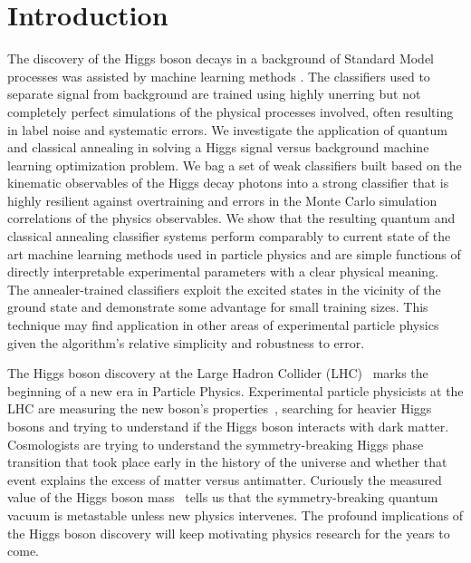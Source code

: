 \documentclass[.chapters/Higgs/.chapters/Higgs/main.tex]{subfiles}
\begin{document}

\section*{Introduction}
	The discovery of the Higgs boson decays in a background of Standard Model processes was assisted by machine learning methods \cite{Chatrchyan:2012xdj,Aad:2012tfa}. The classifiers used to separate signal from background are trained using  highly unerring but not completely perfect simulations of the physical processes involved, often resulting in label noise and systematic errors. We investigate the application of quantum\cite{kadowaki_quantum_1998,RevModPhys.80.1061,Neven1,Pudenz:2013kx} and classical annealing\cite{kirkpatrick_optimization_1983,katzgraber:06a} in solving a Higgs signal versus background machine learning optimization problem.  We bag a set of weak classifiers built based on the kinematic observables of the Higgs decay photons into a strong classifier that is highly resilient against overtraining and errors in the Monte Carlo simulation correlations of the physics observables. We show that the resulting quantum and classical annealing classifier systems perform comparably to current state of the art machine learning methods used in particle physics\cite{keras,xgboost} and are simple functions of directly interpretable experimental parameters with a clear physical meaning. The annealer-trained classifiers exploit the excited states in the vicinity of the ground state and demonstrate some advantage for small training sizes. This  technique may find application in other areas of experimental particle physics given the algorithm's relative simplicity and robustness to error.

The Higgs boson discovery at the Large Hadron Collider (LHC)~\cite{Chatrchyan:2012xdj,Aad:2012tfa} 
marks the beginning of a new era in Particle Physics.  Experimental particle physicists at the LHC are measuring the new boson's properties~\cite{Khachatryan:2014ira,Aad:2014eha}, searching for heavier Higgs 
bosons\cite{Olive:2016xmw} and trying to understand if the Higgs boson interacts with dark 
matter\cite{Englert:2011yb}. Cosmologists are trying to understand 
the symmetry-breaking Higgs phase transition that took place early in the history of the universe and 
whether that event explains the excess of matter versus antimatter\cite{Morrissey:2012db}. 
Curiously the measured value of the Higgs boson mass~\cite{Olive:2016xmw} tells us that  the symmetry-breaking 
quantum vacuum is metastable\cite{Buttazzo:2013uya} unless new physics intervenes. 
The profound implications of the Higgs boson discovery will keep motivating physics research for the years to come. 
\end{document}

